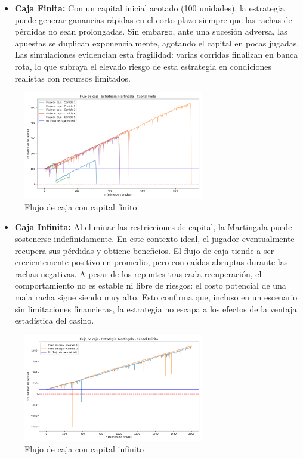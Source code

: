 \documentclass{article}
\begin{document}
\begin{itemize}
    \item \textbf{Caja Finita:} Con un capital inicial acotado (100 unidades), la estrategia puede generar ganancias rápidas en el corto plazo siempre que las rachas de pérdidas no sean prolongadas. Sin embargo, ante una sucesión adversa, las apuestas se duplican exponencialmente, agotando el capital en pocas jugadas. Las simulaciones evidencian esta fragilidad: varias corridas finalizan en banca rota, lo que subraya el elevado riesgo de esta estrategia en condiciones realistas con recursos limitados.
\end{itemize}
    \begin{figure}[H]
        \centering
        \includegraphics[width=0.7\textwidth]{Imagenes/flujo_caja_Martingala_f.png}
        \caption{Flujo de caja con capital finito}
        \label{fig:mg_finita}    
    \end{figure}
    
\begin{itemize}
    \item \textbf{Caja Infinita:} Al eliminar las restricciones de capital, la Martingala puede sostenerse indefinidamente. En este contexto ideal, el jugador eventualmente recupera sus pérdidas y obtiene beneficios. El flujo de caja tiende a ser crecientemente positivo en promedio, pero con caídas abruptas durante las rachas negativas. A pesar de los repuntes tras cada recuperación, el comportamiento no es estable ni libre de riesgos: el costo potencial de una mala racha sigue siendo muy alto. Esto confirma que, incluso en un escenario sin limitaciones financieras, la estrategia no escapa a los efectos de la ventaja estadística del casino.
\end{itemize}
    \begin{figure}[H]
        \centering
        \includegraphics[width=0.7\textwidth]{Imagenes/flujo_caja_Martingala_i.png}
        \caption{Flujo de caja con capital infinito}
        \label{fig:mg_finita}    
    \end{figure}
    
\end{document}
